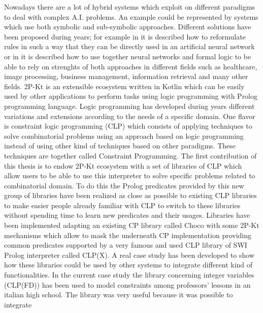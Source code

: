 Nowadays there are a lot of hybrid systems which exploit on different paradigms to deal with complex A.I. problems.
An example could be represented by systems which use both symbolic and sub-symbolic approaches. Different solutions have been proposed during
years; for example in \cite{TOWELL1994119} it is described how to reformulate rules in such a way that they can be directly used in an
artificial neural network or in \cite{https://doi.org/10.48550/arxiv.2209.12618} it is described how to use together neural networks and formal logic to be able to rely on
strenghts of both approaches in different fields such as healthcare, image processing, business management, information retrieval and many other fields.\newline\newline
2P-Kt is an extensible ecosystem written in Kotlin which can be easily used by other applications to perform tasks using logic programming with Prolog programming language.
Logic programming has developed during years different variations and extensions according to the needs of a specific domain. One flavor is constraint logic programming (CLP) which
consists of applying techniques to solve combinatorial problems using an approach based on logic programming instead of using
other kind of techniques based on other paradigms. These techniques are together called Constraint Programming.
The first contribution of this thesis is to endow 2P-Kt ecosystem with a set of libraries of CLP which allow users to be able to use this interpreter to solve specific
problems related to combinatorial domain. To do this the Prolog predicates provided by this new group of libraries have been realized as close as
possible to existing CLP libraries to make easier people already familiar with CLP to switch to these libraries without spending time to learn new
predicates and their usages. Libraries have been implemented adapting an existing CP library called Choco with some 2P-Kt mechanisms which allow
to mask the underneath CP implementation providing common predicates supported by a very famous and used CLP library of SWI Prolog interpreter called
CLP(X).\newline\newline
A real case study has been developed to show how these libraries could be used by other systems to integrate different kind of functionalities. In the current case study the library concerning
integer variables (CLP(FD)) has been used to model constraints among professors' lessons in an italian high school. The library was very useful because it was possible to integrate
